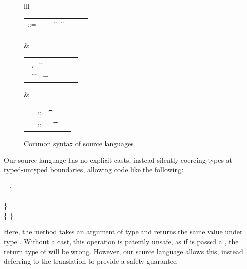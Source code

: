 \documentclass[acmsmall, anonymous, authordraft, review]{acmart} %
\begin{document}
\begin{figure}[!h]\hrulefill
\vspace{2mm}  \small

\begin{tabular}{lll}
\begin{minipage}{5.5cm}\begin{tabular}{@{}l@{~}l@{}l@{}l@{}l@{}l@{}l@{}l}
\e\hspace{.1cm} ::= & \hspace{.2cm} \x        
    &\B \this         
   &\B \FRead\f     
   &\B \FWrite\f\e \\
   &  
   &\B \Call\e\m\e 
   &\B \that      
   &\B \New\C{\e[1]..}  
\end{tabular}\end{minipage}&
\begin{minipage}{4cm}\begin{tabular}{l@{~}l@{}l@{}ll}
   ~ \k &::= \Class \C {\fd[1]..}{\md[1]..} \\
~ \t&::= ~ \any  \B   \C  \B \src{\CW}  \\ 
\end{tabular}\end{minipage} &
\begin{minipage}{2.9cm}\begin{tabular}{l@{~}l@{}l@{}l}
\md &::= \Mdef\m\x\t\t\e \\
~\fd&::= ~ \Fdef\f\t \\ 
\end{tabular}\end{minipage}\end{tabular}

\vspace{2mm}\hrulefill
\caption{Common syntax of source languages}\label{f:sourcesyntax}
\end{figure}

Our source language has no explicit casts, instead silently coercing
types at typed-untyped boundaries, allowing code like the following:

\begin{tabbing}
\hspace{1cm}\K\HS \Call{\New\C{}}\m{\New\D{}} \HS\HS\HS\WHERE\HS
  \K\HS =\HS \= \class\= \C \{\\
       \> \HS \Mdef\m\x\any\C{\HS\x\HS}\\
       \> \}  \\
       \>\class \D \{ \}
\end{tabbing}         

\noindent Here, the method \m takes an argument of type \any and returns the
same value under type \C. Without a cast, this operation is patently unsafe,
as if \m is passed a \D, the return type of \m will be wrong. However, our
source language allows this, instead deferring  to the translation to  provide
a safety guarantee.
\end{document}
